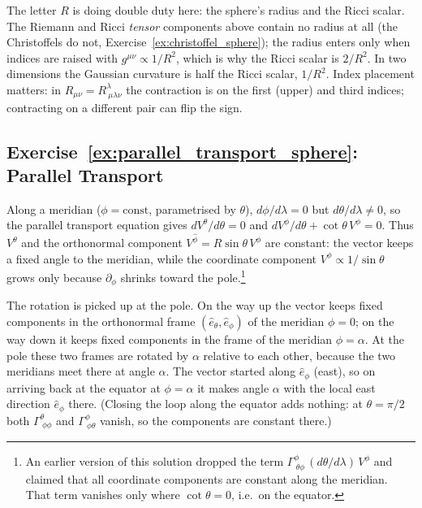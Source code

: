 \begin{annotation}
The letter $R$ is doing double duty here: the sphere's radius and the Ricci scalar. The
Riemann and Ricci \emph{tensor} components above contain no radius at all (the Christoffels
do not, Exercise~\ref{ex:christoffel_sphere}); the radius enters only when indices are raised
with $g^{\mu\nu} \propto 1/R^2$, which is why the Ricci scalar is $2/R^2$. In two dimensions the
Gaussian curvature is half the Ricci scalar, $1/R^2$. Index placement matters: in
$R_{\mu\nu} = R^\lambda_{\ \mu\lambda\nu}$ the contraction is on the first (upper) and third
indices; contracting on a different pair can flip the sign.
\end{annotation}

\subsection*{Exercise~\ref{ex:parallel_transport_sphere}: Parallel Transport}

Along a meridian ($\phi = \text{const}$, parametrised by $\theta$),
$d\phi/d\lambda = 0$ but $d\theta/d\lambda \neq 0$, so the parallel
transport equation gives $dV^\theta/d\theta = 0$ and
$dV^\phi/d\theta + \cot\theta\,V^\phi = 0$.  Thus $V^\theta$ and the
orthonormal component $V^{\hat\phi} = R\sin\theta\,V^\phi$ are constant:
the vector keeps a fixed angle to the meridian, while the coordinate
component $V^\phi \propto 1/\sin\theta$ grows only because $\partial_\phi$
shrinks toward the pole.\footnote{An earlier version of this solution
dropped the term $\Gamma^\phi_{\ \theta\phi}\,(d\theta/d\lambda)\,V^\phi$
and claimed that all coordinate components are constant along the meridian.
That term vanishes only where $\cot\theta = 0$, i.e.\ on the equator.}

The rotation is picked up at the pole.  On the way up the vector keeps
fixed components in the orthonormal frame
$(\hat e_\theta, \hat e_\phi)$ of the meridian $\phi = 0$; on the way
down it keeps fixed components in the frame of the meridian
$\phi = \alpha$.  At the pole these two frames are rotated by $\alpha$
relative to each other, because the two meridians meet there at
angle $\alpha$.  The vector started along $\hat e_\phi$ (east), so on
arriving back at the equator at $\phi = \alpha$ it makes angle $\alpha$
with the local east direction $\hat e_\phi$ there.  (Closing the loop along the equator adds nothing: at
$\theta = \pi/2$ both $\Gamma^\theta_{\ \phi\phi}$ and
$\Gamma^\phi_{\ \phi\theta}$ vanish, so the components are constant
there.)

